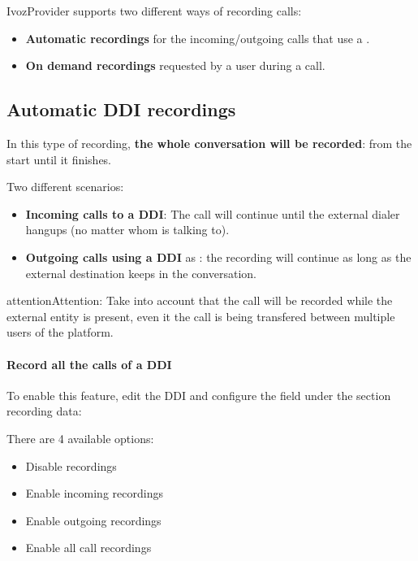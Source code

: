 \documentclass[letterpaper,10pt,english]{sphinxmanual}
\begin{document}
IvozProvider supports two different ways of recording calls:
\begin{itemize}
\item {} 
\textbf{Automatic recordings} for the incoming/outgoing calls that use a
{\hyperref[company/ddis:ddis]{}}.

\item {} 
\textbf{On demand recordings} requested by a user during a call.

\end{itemize}


\subsection{Automatic DDI recordings}
\label{company/call_recording:automatic-ddi-recordings}
In this type of recording, \textbf{the whole conversation will be recorded}: from
the start until it finishes.

Two different scenarios:
\begin{itemize}
\item {} 
\textbf{Incoming calls to a DDI}: The call will continue until the external
dialer hangups (no matter whom is talking to).

\item {} 
\textbf{Outgoing calls using a DDI} as {\hyperref[company/ddis:ddis]{}}: the
recording will continue as long as the external destination keeps in the
conversation.

\end{itemize}

\begin{notice}{attention}{Attention:}
Take into account that the call will be recorded while the
external entity is present, even it the call is being transfered between
multiple users of the platform.
\end{notice}
\paragraph{Record all the calls of a DDI}

To enable this feature, edit the DDI and configure the field under the section
recording data:

\noindent{}

There are 4 available options:
\begin{itemize}
\item {} 
Disable recordings

\item {} 
Enable incoming recordings

\item {} 
Enable outgoing recordings

\item {} 
Enable all call recordings

\end{itemize}
\end{document}
